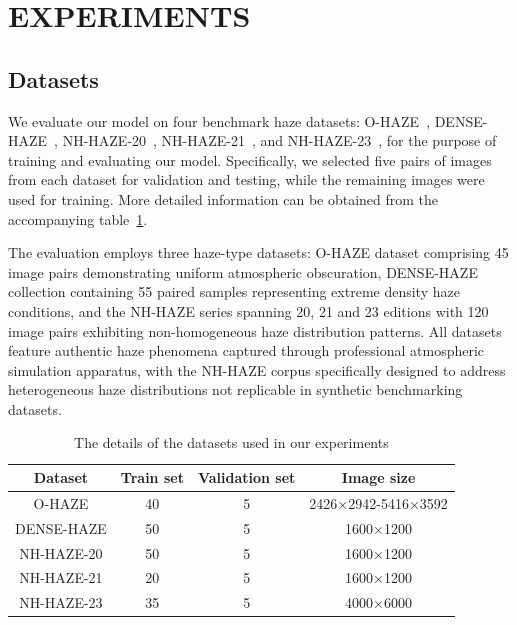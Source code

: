 \documentclass[journal]{IEEEtran}
\begin{document}
\section{EXPERIMENTS}

\subsection{Datasets}
We evaluate our model on four benchmark haze datasets: O-HAZE~\cite{ancuti2018ohaze}, DENSE-HAZE~\cite{ancuti2019dense}, NH-HAZE-20~\cite{ancuti2020ntire}, NH-HAZE-21~\cite{ancuti2021ntire}, and NH-HAZE-23~\cite{ancuti2023ntire}, for the purpose of training and evaluating our model. Specifically, we selected five pairs of images from each dataset for validation and testing, while the remaining images were used for training. More detailed information can be obtained from the accompanying table~\ref{table_dataset}.

The evaluation employs three haze-type datasets: O-HAZE dataset comprising 45 image pairs demonstrating uniform atmospheric obscuration, DENSE-HAZE collection containing 55 paired samples representing extreme density haze conditions, and the NH-HAZE series spanning 20, 21 and 23 editions with 120 image pairs exhibiting non-homogeneous haze distribution patterns. All datasets feature authentic haze phenomena captured through professional atmospheric simulation apparatus, with the NH-HAZE corpus specifically designed to address heterogeneous haze distributions not replicable in synthetic benchmarking datasets.

\begin{table}
	\begin{center}
		\caption{The details of the datasets used in our experiments}
		\label{table_dataset}
		\begin{tabular}{ c | c | c | c }
			\hline
			Dataset    & Train set & Validation set & Image size          \\
			\hline
			O-HAZE     & 40        & 5              & 2426×2942-5416×3592 \\
			DENSE-HAZE & 50        & 5              & 1600×1200           \\
			NH-HAZE-20 & 50        & 5              & 1600×1200           \\
			NH-HAZE-21 & 20        & 5              & 1600×1200           \\
			NH-HAZE-23 & 35        & 5              & 4000×6000           \\
			\hline
		\end{tabular}
	\end{center}
\end{table}
\end{document}
